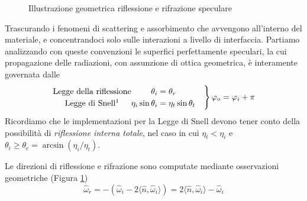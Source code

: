 \begin{figure}[tb]
\begin{scaletikzpicturetowidth}{\linewidth}
\end{scaletikzpicturetowidth}
\caption{Illustrazione geometrica riflessione e rifrazione speculare}
\label{chapter3:surface:specular}
\end{figure}
Trascurando i fenomeni di scattering e assorbimento che avvengono all'interno del materiale, e concentrandoci solo sulle interazioni a livello di
interfaccia. Partiamo analizzando con queste convenzioni le superfici perfettamente speculari, la cui propagazione delle radiazioni, con assunzione di 
ottica geometrica, \`e interamente governata dalle 
\begin{align}\label{chapter3:surface:snell}
	\renewcommand{\arraystretch}{1.2}%
	\setlength{\arraycolsep}{0pt}%
	\left.\begin{array}{ c r >{{}}l@{\quad} }
		\text{Legge della riflessione} & \theta_i &= \theta_r  \\
		\text{Legge di Snell\footnotemark{}} & \eta_i \sin\theta_i &= \eta_t\sin\theta_t \\
	\end{array}
	\right\}\varphi_o = \varphi_i + \pi
\end{align}
Ricordiamo che le implementazioni per la Legge di Snell devono tener conto della possibilit\`a di \textit{riflessione interna totale}, nel caso in
cui $\eta_t < \eta_i$ e \mbox{$\theta_i \geq \theta_c = \arcsin(\eta_i/\eta_t)$}.\par
Le direzioni di riflessione e rifrazione sono computate mediante osservazioni geometriche (Figura \ref{chapter3:surface:specular})
\begin{equation}
	\hat{\omega}_r = -(\hat{\omega}_i - 2\langle\hat{n},\hat{\omega}_i\rangle) = 2\langle\hat{n},\hat{\omega}_i\rangle - \hat{\omega}_i
\end{equation}
